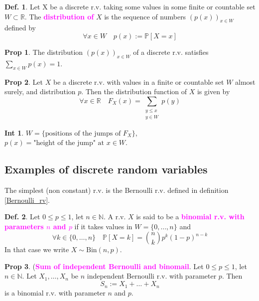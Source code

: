 \documentclass[8pt,a4paper,landscape]{article}
\theoremstyle{definition}
\newtheorem{definition}{Def.}[section]
\theoremstyle{example}
\theoremstyle{intuition}
\newtheorem*{intuition}{Int}
\theoremstyle{definition}
\newtheorem{proposition}{Prop}[section]
\newcommand{\mydef}[1]{\textcolor{magenta}{\textbf{#1}}}
\newcommand{\prob}[1]{\mathbb{P}\left[ #1 \right]}
\begin{document}
\begin{multicols}{3}
			\begin{definition}
				Let X be a discrete r.v. taking some values in some finite or countable set $W \subset \mathbb{R}$. The \mydef{distribution of} $X$ is the sequence of numbers $(p(x))_{x \in W}$ defined by 
				$$
					\forall x \in W \quad p(x) := \prob{X = x}
				$$
			\end{definition}

			\begin{proposition}
				The distribution $(p(x))_{x \in W}$ of a discrete r.v. satisfies $\sum_{x \in W} p(x) = 1$.
			\end{proposition}

			\begin{proposition}
				Let $X$ be a discrete r.v. with values in a finite or countable set $W$ almost surely, and distribution $p$. Then the distribution function of $X$ is given by
				$$
				\forall x \in \mathbb{R} \quad F_X(x) = \sum_{\substack{y \leq x \\ y \in W}} p(y)
				$$
			\end{proposition}

			\begin{intuition}
				$W = \{\text{positions of the jumps of } F_X\}$,\\
				$p(x) = \text{"height of the jump" at } x \in W$.
			\end{intuition}


		\subsection{Examples of discrete random variables}
			
		 	The simplest (non constant) r.v. is the Bernoulli r.v. defined in definition \ref{Bernoulli_rv}.

			\begin{definition}
				Let $0 \leq p \leq 1$, let $n \in \mathbb{N}$. A r.v. $X$ is said to be a \mydef{binomial r.v. with parameters $n$ and $p$} if it takes values in $W = \{0,\ldots, n\}$ and 
				$$
				\forall k \in \{0,\ldots,n\} \quad \prob{X = k} = \binom{n}{k} p^k (1-p)^{n-k}
				$$
				In that case we write $X \sim \text{Bin}(n,p)$.
			\end{definition}

			\begin{proposition}
				(\mydef{Sum of independent Bernoulli and binomail}. Let $0 \leq p \leq 1$, let $n \in \mathbb{N}$. Let $X_1, \ldots, X_n$ be $n$ independent Bernoulli r.v. with parameter $p$. Then
				$$
					S_n := X_1 + \ldots + X_n
				$$
				is a binomial r.v. with parameter $n$ and $p$.
			\end{proposition}


\end{multicols}
\end{document}
